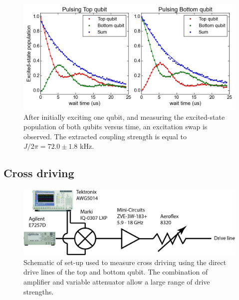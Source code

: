       \begin{figure}[h]
        \centering
        \includegraphics[width=\linewidth]{Figures/Exploring frequency reuse/excitation_swap.png}
        \caption{After initially exciting one qubit, and measuring the excited-state population of both qubits versus time, an excitation swap is observed. The extracted coupling strength is equal to $J/2\pi=72.0 \pm 1.8$ kHz.}
        \label{fig:excitation swap}
      \end{figure}

    \subsection{Cross driving}
      \label{ssec:cross driving}

      \begin{figure}[h]
        \centering
        \includegraphics[width=.8\textwidth]{Figures/Exploring frequency reuse/cross-driving_setup.jpg}
        \caption{Schematic of set-up used to measure cross driving using the direct drive lines of the top and bottom qubit. The combination of amplifier and variable attenuator allow a large range of drive strengths.}
        \label{fig:cross-driving schematic}
      \end{figure}


